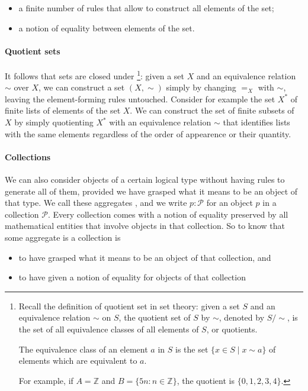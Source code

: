\begin{itemize}
\item a finite number of rules that allow to construct all elements of the set;
\item a notion of equality between elements of the set.
\end{itemize}

\paragraph{Quotient sets}

It follows that sets are closed under \footnote{
  Recall the definition of quotient set in set theory: given a set $S$ and an
  equivalence relation $\sim$ on $S$, the quotient set of $S$ by $\sim$, denoted
  by $S / \sim$, is the set of all equivalence classes of all elements of $S$,
  or quotients.

  The equivalence class of an element $a$ in $S$ is the set
  $ \{x\in S\mid x\sim a\}$ of elements which are equivalent to $a$.  

  For example, if $A=\mathbb{Z}$ and $B=\{5n : n \in \mathbb{Z}\}$,
  the quotient is $\{0,1,2,3,4\}$.}:
given a set $X$ and an equivalence relation $\sim$ over $X$, we can
construct a set $(X,\sim)$ simply by changing $=_X$ with $\sim$,
leaving the element-forming rules untouched.
Consider for example the set $X^*$ of finite lists of elements of the set
$X$. We can construct the set of finite subsets of $X$ by simply quotienting
$X^*$ with an equivalence relation $\sim$ that identifies lists with the same
elements regardless of the order of appearence or their quantity.

\paragraph{Collections}

We can also consider objects of a certain logical type without having
rules to generate all of them, provided we have grasped what it means
to be an object of that type.
We call these aggregates , and we write $p :
\mathcal{P}$ for an object $p$ in a collection $\mathcal{P}$. Every collection
comes with a notion of equality preserved by all mathematical entities that
involve objects in that collection. So to know that some aggregate is a
collection is

\begin{itemize}
\item to have grasped what it means to be an object of that collection, and
\item to have given a notion of equality for objects of that collection
\end{itemize}

